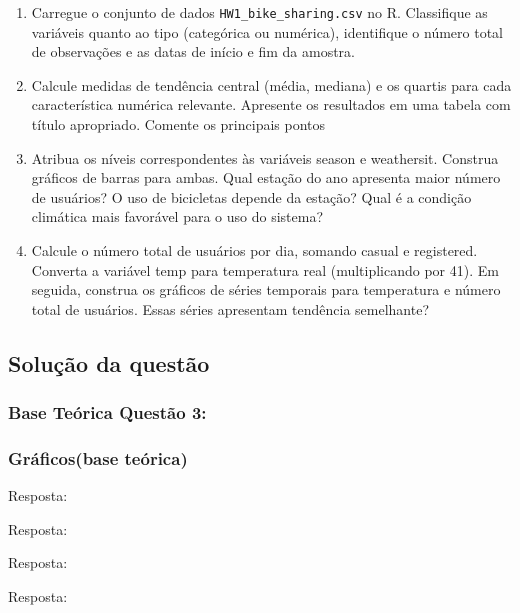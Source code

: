\documentclass[a4paper,11pt]{article}
\begin{document}
\begin{enumerate}[leftmargin=*]
\item Carregue o conjunto de dados \texttt{HW1\_bike\_sharing.csv}  no R. Classifique as variáveis quanto ao tipo (categórica ou numérica), identifique o número total de observações e as datas de início e fim da amostra.

\item Calcule medidas de tendência central (média, mediana) e os quartis para cada característica numérica relevante. Apresente os resultados em uma tabela com título
apropriado. Comente os principais pontos

\item Atribua os níveis correspondentes às variáveis season e weathersit. Construa gráficos de barras para ambas. Qual estação do ano apresenta maior número de usuários? O uso de bicicletas depende da estação? Qual é a condição climática mais favorável para o uso do sistema?

\item Calcule o número total de usuários por dia, somando casual e registered. Converta
a variável temp para temperatura real (multiplicando por 41). Em seguida, construa os gráficos de séries temporais para temperatura e número total de usuários. Essas séries apresentam tendência semelhante?

\end{enumerate}

\subsection*{Solução da questão} 					

\subsubsection*{Base Teórica Questão 3:} 



\subsubsection*{Gráficos(base teórica)} 


\begin{description}[leftmargin=*]

\item[3.1] Resposta: \\

\item[3.2] Resposta: \\

\item[3.3] Resposta: \\

\item[3.4] Resposta: \\

\end{description}

\newpage
\begin{appendices}


\end{appendices}
\end{document}
